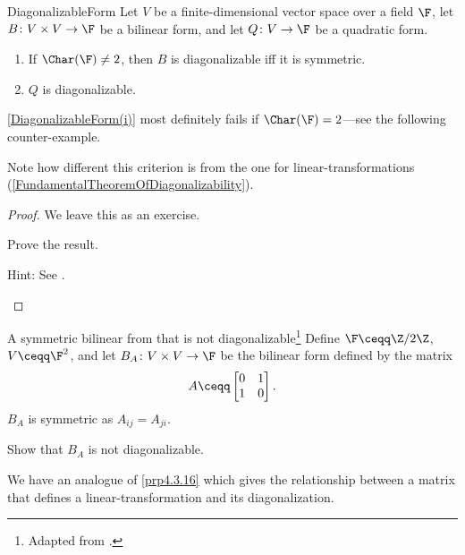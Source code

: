 \begin{thm}{}{DiagonalizableForm}
	Let $V$ be a finite-dimensional vector space over a field $\F$, let $B\colon V\times V\rightarrow \F$ be a bilinear form, and let $Q\colon V\rightarrow \F$ be a quadratic form.
	\begin{enumerate}
		\item \label{DiagonalizableForm(i)}If $\Char (\F )\neq 2$, then $B$ is diagonalizable iff it is symmetric.
		\item \label{DiagonalizableForm(ii)}$Q$ is diagonalizable.
	\end{enumerate}
	\begin{rmk}
		\cref{DiagonalizableForm(i)} most definitely fails if $\Char (\F )=2$---see the following counter-example.
	\end{rmk}
	\begin{rmk}
		Note how different this criterion is from the one for linear-transformations (\cref{FundamentalTheoremOfDiagonalizability}).
	\end{rmk}
	\begin{proof}
		We leave this as an exercise.
		\begin{exr}[breakable=false]{}{}
			Prove the result.
			\begin{rmk}
				Hint:  See \cite[Theorem 6.35]{Friedberg}.
			\end{rmk}
		\end{exr}
	\end{proof}
\end{thm}
\begin{exm}{A symmetric bilinear from that is not diagonalizable}{}\footnote{Adapted from \cite[Example 6.8.5]{Friedberg}.}
	Define $\F \ceqq \Z /2\Z$, $V\ceqq \F ^2$, and let $B_A\colon V\times V\rightarrow \F$ be the bilinear form defined by the matrix
	\begin{equation}
		A\ceqq \begin{bmatrix}0 & 1 \\ 1 & 0\end{bmatrix}.
	\end{equation}
	$B_A$ is symmetric as $A_{ij}=A_{ji}$.
	\begin{exr}[breakable=false]{}{}
		Show that $B_A$ is not diagonalizable.
	\end{exr}
\end{exm}
We have an analogue of \cref{prp4.3.16} which gives the relationship between a matrix that defines a linear-transformation and its diagonalization.

